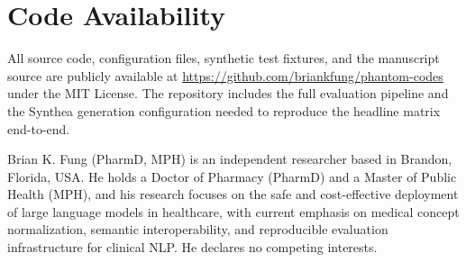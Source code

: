 \documentclass[journal]{IEEEtran}
\begin{document}
\section*{Code Availability}
All source code, configuration files, synthetic test fixtures, and
the manuscript source are publicly available at
\url{https://github.com/briankfung/phantom-codes} under the MIT
License. The repository includes the full evaluation pipeline and
the Synthea generation configuration needed to reproduce the
headline matrix end-to-end.

\printbibliography

\begin{IEEEbiographynophoto}{Brian K. Fung}
(PharmD, MPH) is an independent researcher based in Brandon, Florida,
USA. He holds a Doctor of Pharmacy (PharmD) and a Master of Public
Health (MPH), and his research focuses on the safe and cost-effective
deployment of large language models in healthcare, with current
emphasis on medical concept normalization, semantic interoperability,
and reproducible evaluation infrastructure for clinical NLP. He
declares no competing interests.
\end{IEEEbiographynophoto}
\end{document}
